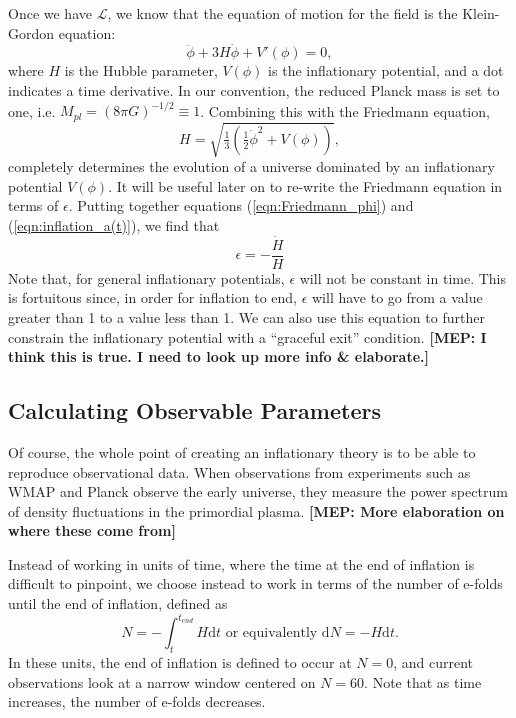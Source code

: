 \documentclass[onecolumn,apj]{emulateapj}
\def\d{\mathrm{d}}
\def\L{\mathscr{L}}
\def\half{\tfrac{1}{2}}
\newcommand{\mep}[1]{{\color{applegreen} \textbf{[MEP:  #1]}}}
\begin{document}
Once we have $\L$, we know that the equation of motion for the field is the Klein-Gordon equation:
\begin{equation}
\ddot \phi + 3H \dot \phi + V'(\phi) = 0,
\label{eqn:KG}
\end{equation}
where $H$ is the Hubble parameter, $V(\phi)$ is the inflationary potential, and a dot indicates a time derivative. In our convention, the reduced Planck mass is set to one, i.e. $M_{pl} = (8\pi G)^{-1/2} \equiv 1$. Combining this with the Friedmann equation, 
\begin{equation}
H = \sqrt{\tfrac{1}{3} \left ( \half \dot \phi^2 + V(\phi) \right )},
\label{eqn:Friedmann}
\end{equation}
completely determines the evolution of a universe dominated by an inflationary potential $V(\phi)$. It will be useful later on to re-write the Friedmann equation in terms of $\epsilon$. Putting together equations (\ref{eqn:Friedmann_phi}) and (\ref{eqn:inflation_a(t)}), we find that
\begin{equation}
\epsilon = -\frac{\dot H}{H}
\label{eqn:Friedmann_epsilon}
\end{equation}
Note that, for general inflationary potentials, $\epsilon$ will not be constant in time. This is fortuitous since, in order for inflation to end, $\epsilon$ will have to go from a value greater than 1 to a value less than 1. We can also use this equation to further constrain the inflationary potential with a ``graceful exit'' condition. \mep{I think this is true. I need to look up more info \& elaborate.}

\subsection{Calculating Observable Parameters}
Of course, the whole point of creating an inflationary theory is to be able to reproduce observational data. When observations from experiments such as WMAP and Planck observe the early universe, they measure the power spectrum of density fluctuations in the primordial plasma. \mep{More elaboration on where these come from}

Instead of working in units of time, where the time at the end of inflation is difficult to pinpoint, we choose instead to work in terms of the number of e-folds until the end of inflation, defined as 
\begin{equation}
N = -\int_t^{t_{end}} H \d t \text{\ \ \ or\ equivalently\ \ \ } \d N = -H \d t. 
\label{eqn:defN}
\end{equation}
In these units, the end of inflation is defined to occur at $N=0$, and current observations look at a narrow window centered on $N=60$. Note that as time increases, the number of e-folds decreases. 
\end{document}
